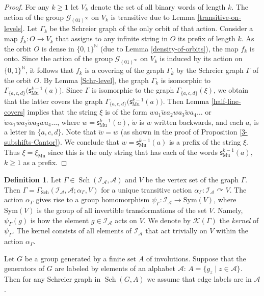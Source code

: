 \documentclass[12pt]{article}
\theoremstyle{definition}
\newtheorem{definition}[theorem]{Definition}
\def\bN{\mathbb{N}}
\def\cA{\mathcal{A}}
\def\cG{\mathcal{G}}
\def\cI{\mathcal{I}}
\def\cK{\mathcal{K}}
\def\al{\alpha}
\def\subst{\mathsf{s}}
\def\sub{\subst_{\mathrm{Mu}}}
\def\xiGE{\xi_{\mathrm{Mu}}}
\def\Sch{\mathop{\mathrm{Sch}}}
\begin{document}
\begin{proof}
For any $k\ge1$ let $V_k$ denote the set of all binary words of length 
$k$.  The action of the group $\cG_{(01)^\infty}$ on $V_k$ is transitive 
due to Lemma \ref{transitive-on-levels}.  Let $\Gamma_k$ be the Schreier 
graph of the only orbit of that action.  Consider a map $f_k:O\to V_k$ that 
assigns to any infinite string in $O$ its prefix of length $k$.  As the 
orbit $O$ is dense in $\{0,1\}^{\bN}$ (due to Lemma 
\ref{density-of-orbits}), the map $f_k$ is onto.  Since the action of the 
group $\cG_{(01)^\infty}$ on $V_k$ is induced by its action on 
$\{0,1\}^{\bN}$, it follows that $f_k$ is a covering of the graph 
$\Gamma_k$ by the Schreier graph $\Gamma$ of the orbit $O$.  By Lemma 
\ref{Schr-level}, the graph $\Gamma_k$ is isomorphic to
$\Gamma_{\{a,c,d\}}\bigl(\sub^{k-1}(a)\bigr)$.  Since $\Gamma$ is 
isomorphic to the graph $\Gamma_{\{a,c,d\}}(\xi)$, we obtain that the 
latter covers the graph $\Gamma_{\{a,c,d\}}\bigl(\sub^{k-1}(a)\bigr)$.  
Then Lemma \ref{half-line-covers} implies that the string $\xi$ is of the 
form $wa_1\overleftarrow{w}a_2wa_3\overleftarrow{w}a_4\ldots$ or 
$\overleftarrow{w}a_1wa_2\overleftarrow{w}a_3wa_4\ldots$, where 
$w=\sub^{k-1}(a)$, $\overleftarrow{w}$ is $w$ written backwards, and each 
$a_i$ is a letter in $\{a,c,d\}$.  Note that $\overleftarrow{w}=w$ (as 
shown in the proof of Proposition \ref{3-subshifts-Cantor}).  We conclude 
that $w=\sub^{k-1}(a)$ is a prefix of the string $\xi$.  Thus $\xi=\xiGE$ 
since this is the only string that has each of the words $\sub^{k-1}(a)$, 
$k\ge1$ as a prefix.
\end{proof}

\begin{definition}\label{def-kernel}
Let $\Gamma\in\Sch(\cI_{\cA},\cA)$ and $V$ be the vertex set of the graph 
$\Gamma$.  Then $\Gamma=\Gamma_{\Sch}(\cI_{\cA},\cA;\al_\Gamma,V)$ for a 
unique transitive action $\al_\Gamma:\cI_{\cA}\curvearrowright V$.  The 
action $\al_\Gamma$ gives rise to a group homomorphism 
$\psi_\Gamma:\cI_{\cA}\to\mathrm{Sym}(V)$, where $\mathrm{Sym}(V)$ is the 
group of all invertible transformations of the set $V$.  Namely, 
$\psi_\Gamma(g)$ is how the element $g\in\cI_{\cA}$ acts on $V$.  We denote 
by $\cK(\Gamma)$ the \emph{kernel} of $\psi_\Gamma$.  The kernel consists 
of all elements of $\cI_{\cA}$ that act trivially on $V$ within the action 
$\al_\Gamma$.
\end{definition}

Let $G$ be a group generated by a finite set $A$ of involutions.  Suppose 
that the generators of $G$ are labeled by elements of an alphabet $\cA$: 
$A=\{g_z\mid z\in\cA\}$.  Then for any Schreier graph in $\Sch(G,A)$ we 
assume that edge labels are in $\cA$.
\end{document}
